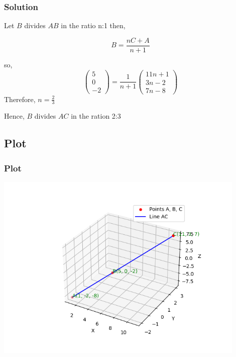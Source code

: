 \documentclass{beamer}
\theoremstyle{remark}
\numberwithin{equation}{section}
\begin{document}
\begin{frame}
\frametitle{Solution}

Let $B$ divides $AB$ in the ratio n:1 then,

\begin{equation}
    B = \frac{nC+A}{n+1}
\end{equation}

so,
\begin{equation}
    \begin{pmatrix}
        5\\
        0\\
        -2
    \end{pmatrix}=\frac{1}{n+1}\begin{pmatrix}
        11n+1\\
        3n-2\\
        7n-8
    \end{pmatrix}
\end{equation}
Therefore, $n = \frac{2}{3}$


Hence, $B$ divides $AC$ in the ration 2:3
\end{frame}

\subsection{Plot}
\begin{frame}
\frametitle{Plot}
    \begin{center}
\includegraphics[width=0.9\textwidth]{figs/figure1.png}
\end{center}
\end{frame}
\end{document}
